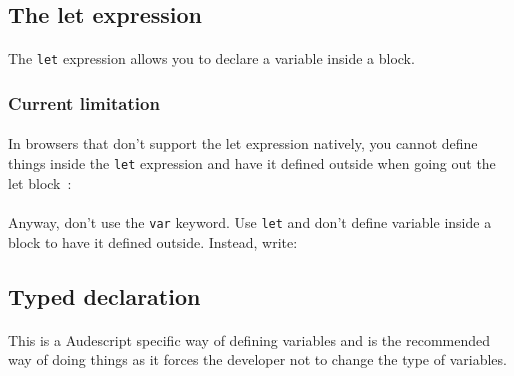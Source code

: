 \documentclass{article}
\begin{document}
\begin{sloppypar}
   
   
   

\subsection{ The let expression}


\paragraph{}
The \verb!let! expression allows you to declare a variable inside a block.
      {}

      

\subsubsection{ Current limitation}


\paragraph{}
In browsers that don't support the let expression natively, you cannot define things inside the \verb!let! expression and have it defined outside when going out the let block :
         {}

         
\paragraph{}
Anyway, don't use the \verb!var! keyword. Use \verb!let! and don't define variable inside a block to have it defined outside. Instead, write:

         {}
      
   
   
   

\subsection{ Typed declaration}


\paragraph{}
This is a Audescript specific way of defining variables and is the recommended way of doing things as it forces the developer not to change the type of variables.
      

\end{sloppypar}
\end{document}

